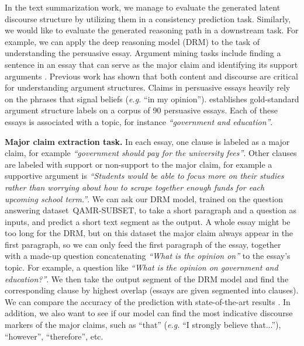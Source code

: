 In the text summarization work, we manage to evaluate the generated latent discourse structure by utilizing them in a consistency prediction task. Similarly, we would like to evaluate the generated reasoning path in a downstream task. For example, we can apply the deep reasoning model (DRM) to the task of understanding the persuasive essay. %
Argument mining tasks include finding a sentence in an essay that can serve as the major claim and identifying its support arguments \cite{DBLP:conf/lrec/ReedPRM08}. Previous work \cite{DBLP:conf/emnlp/StabG14} has shown that both content and discourse are critical for understanding argument structures. Claims in persuasive essays heavily rely on the phrases that signal beliefs (\emph{e.g.} ``in my opinion'').  \cite{DBLP:conf/coling/StabG14} establishes gold-standard argument structure labels on a corpus of 90 persuasive essays. Each of these essays is associated with a topic, for instance \textit{``government and education''}. 

\textbf{Major claim extraction task.} In each essay, one clause is labeled as a major claim, for example \textit{``government should pay for the university fees''}. Other clauses are labeled with support or non-support to the major claim, for example a supportive argument is \textit{``Students would be able to focus more on their studies rather than worrying about how to scrape together enough funds for each upcoming school term.''}. We can ask our DRM model, trained on the question answering dataset~\textsc{QAMR-SUBSET}, to take a short paragraph and a question as inputs, and predict a short text segment as the output. A whole essay might be too long for the DRM, but on this dataset the major claim always appear in the first paragraph, so we can only feed the first paragraph of the essay, together with a made-up question concatenating \textit{``What is the opinion on''} to the essay's topic. For example, a question like \textit{``What is the opinion on government and education?''}. We then take the output segment of the DRM model and find the corresponding clause by highest overlap (essays are given segmented into clauses). We can compare the accuracy of the prediction with state-of-the-art results \cite{DBLP:conf/emnlp/StabG14}. In addition, we also want to see if our model can find the most indicative discourse markers of the major claims, such as ``that'' (\emph{e.g.} ``I strongly believe that...''), ``however'', ``therefore'', etc.


